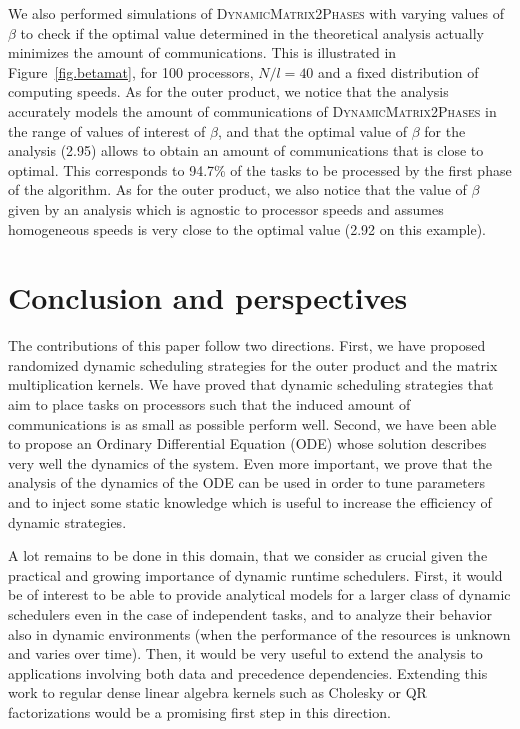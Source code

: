 \documentclass[a4paper,10pt]{article}
\newcommand{\stupidthresholdmat}{\textsc{Dynamic\-Matrix\-2Phases}\xspace}
\begin{document}
We also performed simulations of \stupidthresholdmat with varying values
of $\beta$ to check if the optimal value determined in the theoretical analysis actually
minimizes the amount of communications. This is illustrated in
Figure~\ref{fig.betamat}, for 100 processors, $N/l=40$ and a fixed
distribution of computing speeds. As for the outer product, we notice
that the analysis accurately models the amount of communications of
\stupidthresholdmat in the range of values of interest of $\beta$, and
that the optimal value of $\beta$ for the analysis (2.95) allows to
obtain an amount of communications that is close to optimal. This
corresponds to 94.7\% of the tasks to be processed by the first phase
of the algorithm.  As for the outer product, we also notice that the
value of $\beta$ given by an analysis which is agnostic to processor
speeds and assumes homogeneous speeds is very close to the optimal
value (2.92 on this example).


\section{Conclusion and perspectives}
\label{conclusion}

The contributions of this paper follow two directions. First, we have
proposed randomized dynamic scheduling strategies for the outer
product and the matrix multiplication kernels. We have proved that
dynamic scheduling strategies that aim to place tasks on processors
such that the induced amount of communications is as small as possible
perform well. Second, we have been able to propose an Ordinary
Differential Equation (ODE) whose solution describes very well the dynamics
of the system. Even more important, we prove that the analysis of the
dynamics of the ODE can be used in order to tune parameters and to inject
some static knowledge which is useful to increase the efficiency of
dynamic strategies.

A lot remains to be done in this domain, that we consider as crucial
given the practical and growing importance of dynamic runtime
schedulers. First, it would be of interest to be able to provide
analytical models for a larger class of dynamic schedulers even in the
case of independent tasks, and to analyze their behavior also in
dynamic environments (when the performance of the resources is unknown
and varies over time). Then, it would be very useful to extend the
analysis to applications involving both data and precedence
dependencies. Extending this work to regular dense linear algebra
kernels such as Cholesky or QR factorizations would be a promising first step in
this direction.
\end{document}
